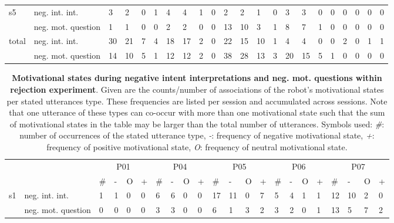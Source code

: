 \begin{table*}[h]
\begin{small}
\begin{tabular*}{\hsize}{@{\extracolsep{\fill}}llllllllllllllllllllll}
      \multirow{2}{*}{s5} & neg. int. int. & 3 & 2 & 0 & 1 & 4 & 4 & 1 & 0 & 2 & 2 & 1 & 0 & 3 & 3 & 0 & 0 & 0 & 0 & 0 & 0\\
      & neg. mot. question & 1 & 1 & 0 & 0 & 2 & 2 & 0 & 0 & 13 & 10 & 3 & 1 & 8 & 7 & 1 & 0 & 0 & 0 & 0 & 0\\
      \multirow{2}{*}{total} & neg. int. int. & 30 & 21 & 7 & 4 & 18 & 17 & 2 & 0 & 22 & 15 & 10 & 1 & 4 & 4 & 0 & 0 & 2 & 0 & 1 & 1\\
      & neg. mot. question & 14 & 10 & 5 & 1 & 12 & 12 & 2 & 0 & 38 & 28 & 13 & 3 & 20 & 15 & 5 & 1 & 0 & 0 & 0 & 0\\
      \bottomrule
    \end{tabular*}
  \end{small}
\end{table*}
\begin{table*}[h]
  \setlength{\tabcolsep}{0.93ex}
  \caption{\textbf{Motivational states during negative intent interpretations and neg. mot. questions within rejection experiment}. 
    Given are the counts/number of associations of the robot's motivational states per stated utterances type. These frequencies are
    listed per session and accumulated across sessions. Note that one utterance of these types can co-occur with more than one motivational state such that
    the sum of motivational states in the table  may be larger than the total number of utterances. Symbols used: \emph{\#}: number of occurrences of the
    stated utterance type, \emph{-}: frequency of negative motivational state, \emph{+}: frequency of positive motivational state, \emph{O}: frequency of
    neutral motivational state.}
  \label{tbl:neg_int_int_mot1}
  \begin{small}
    \begin{tabular*}{\hsize}{@{\extracolsep{\fill}}llllllllllllllllllllll}
      \toprule
      &  & \multicolumn{4}{c}{P01}  & \multicolumn{4}{c}{P04} & \multicolumn{4}{c}{P05} & \multicolumn{4}{c}{P06} & \multicolumn{4}{c}{P07}\\
      \cmidrule(lr){3-6}\cmidrule(lr){7-10}\cmidrule(lr){11-14}\cmidrule(lr){15-18}\cmidrule(lr){19-22}
      &  & \# & - & O & + & \# & - & O & + & \# & - & O & + & \# & - & O & + & \# & - & O & +\\
      \cmidrule(lr){3-6}\cmidrule(lr){7-10}\cmidrule(lr){11-14}\cmidrule(lr){15-18}\cmidrule(lr){19-22}
      \multirow{2}{*}{s1} & neg. int. int. & 1 & 1 & 0 & 0 & 6 & 6 & 0 & 0 & 17 & 11 & 0 & 7 & 5 & 4 & 1 & 1 & 12 & 10 & 2 & 0\\
      & neg. mot. question & 0 & 0 & 0 & 0 & 3 & 3 & 0 & 0 & 6 & 1 & 3 & 2 & 3 & 2 & 0 & 1 & 13 & 5 & 7 & 2\\

\end{tabular*}
\end{small}
\end{table*}
